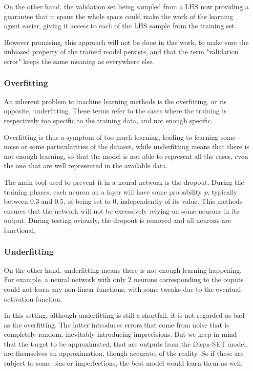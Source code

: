 On the other hand, the validation set being sampled from a LHS now providing a guarantee that it spans the whole space could make the work of the learning agent easier, giving it access to each of the LHS sample from the training set.

However promising, this approach will not be done in this work, to make sure the unbiased property of the trained model persists, and that the term "validation error" keeps the same meaning as everywhere else.

\subsubsection{Overfitting}

An inherent problem to machine learning methods is the overfitting, or its opposite, underfitting. These terms refer to the cases where the training is respectively too specific to the training data, and not enough specific.

Overfitting is thus a symptom of too much learning, leading to learning some noise or some particularities of the dataset, while underfitting means that there is not enough learning, so that the model is not able to represent all the cases, even the one that are well represented in the available data.

The main tool used to prevent it in a neural network is the dropout. During the training phases, each neuron on a layer will have some probability $p$, typically between 0.3 and 0.5, of being set to 0, independently of its value. This methods ensures that the network will not be excessively relying on some neurons in its output. During testing oviously, the dropout is removed and all neurons are functional.

\subsubsection{Underfitting}

On the other hand, underfitting means there is not enough learning happening. For example, a neural network with only 2 neurons corresponding to the ouputs could not learn any non-linear functions, with some tweaks due to the eventual activation function.

In this setting, although underfitting is still a shortfall, it is not regarded as bad as the overfitting. The latter introduces errors that come from noise that is completely random, inevitably introducing imprecisions. But we keep in mind that the target to be approximated, that are outputs from the Dispa-SET model, are themselves an approximation, though accurate, of the reality. So if these are subject to some bias or imperfections, the best model would learn them as well.


